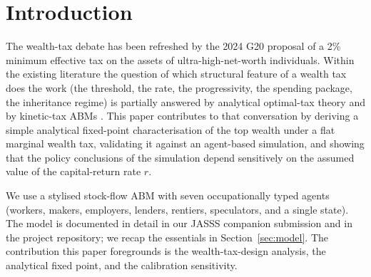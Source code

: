\documentclass[11pt]{article}
\begin{document}
\begin{abstract}
A further result, which we believe is the contribution most likely
to be policy-relevant, is that the wealth tax and an absolute cap
on inheritance are \emph{complementary instruments serving
different goals}.  The wealth tax raises substantial state revenue
(Zucman 2\% above \pounds 10M produces approximately \pounds 56B
per year at simulated UK scale).  The cap raises far less revenue
but redistributes ownership directly: the wealth share held by the
bottom 50\% of the population rises from 0.0\% under status quo to
19.2\% under a \pounds 5M cap, and to 25.3\% under cap-plus-tax.
The two instruments compete for the upper-end tax base but
otherwise stack cleanly.  The choice between cap-alone, tax-alone,
and the combination is a choice between three different policy
objectives, not between three policies aimed at the same one.
Cultural-mechanism results are reported separately in a companion
submission targeting Artificial Life; the regime-classification
and Sankey results are reported in a companion submission
targeting JASSS; the policy-discourse implications of the cap
result are reported in a companion submission targeting Fiscal
Studies.
\end{abstract}

\section{Introduction}

The wealth-tax debate has been refreshed by the 2024
\citet{zucman2024global} G20 proposal of a 2\% minimum effective tax
on the assets of ultra-high-net-worth individuals.  Within the
existing literature the question of which structural feature of a
wealth tax does the work (the threshold, the rate, the progressivity,
the spending package, the inheritance regime) is partially answered
by analytical optimal-tax theory \citep{piketty2013theory,
benhabib2011distribution} and by kinetic-tax ABMs
\citep{bertotti2018modanese, cardoso2025wealth}.  This paper
contributes to that conversation by deriving a simple analytical
fixed-point characterisation of the top wealth under a flat marginal
wealth tax, validating it against an agent-based simulation, and
showing that the policy conclusions of the simulation depend
sensitively on the assumed value of the capital-return rate $r$.

We use a stylised stock-flow ABM with seven occupationally typed
agents (workers, makers, employers, lenders, rentiers, speculators,
and a single state).  The model is documented in detail in our
JASSS companion submission and in the project repository; we recap
the essentials in Section~\ref{sec:model}.  The contribution this
paper foregrounds is the wealth-tax-design analysis, the analytical
fixed point, and the calibration sensitivity.
\end{document}
